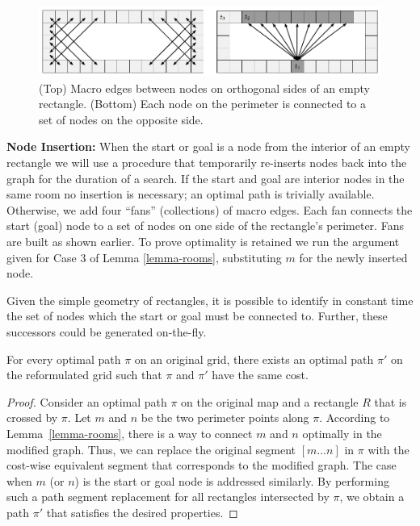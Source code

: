 \begin{figure}[tb]
       \begin{center}
		   \includegraphics[width=0.97\columnwidth, trim = 10mm 10mm 10mm 0mm]
			{diagrams/macroedges_wide.png}
       \end{center}
	\vspace{-3pt}
       \caption{(Top) Macro edges between nodes on orthogonal sides of an empty
       rectangle. (Bottom) Each node on the perimeter is connected to a set of 
		nodes on the opposite side.}
       \label{fig-macroedges}
\end{figure}

\noindent
\textbf{Node Insertion:}
When the start or goal is a node from the interior of an empty rectangle we
will use a procedure that temporarily re-inserts nodes back into the 
graph for the duration of a search.
{If the start and goal are interior nodes
in the same room no insertion is necessary; an optimal path is trivially
available. } {Otherwise, we add four ``fans'' (collections) of macro edges.  Each fan connects
the start (goal) node to a set of nodes on one side of the rectangle's
perimeter.  Fans are built as shown earlier.}
To prove optimality is retained we run the argument given
for Case 3 of Lemma \ref{lemma-rooms}, substituting $m$ for the newly inserted node.
\par
Given the simple geometry of rectangles, it is possible to identify in constant
time the set of nodes which the start or goal must be connected to.  Further,
these successors could be generated on-the-fly.

\begin{theorem}
For every optimal path $\pi$ on an original grid, there exists an optimal path
$\pi'$ on the reformulated grid such that $\pi$ and $\pi'$ have the
same cost.
\end{theorem}
\begin{proof}
Consider an optimal path $\pi$ on the original map and a rectangle $R$ that is
crossed by $\pi$.  Let $m$ and $n$ be the two perimeter points along $\pi$.
According to Lemma~\ref{lemma-rooms}, there is a way to connect $m$ and $n$
optimally in the modified graph. Thus, we can replace the original segment $[m
\dots n]$ in $\pi$ with the cost-wise equivalent segment that corresponds to the
modified graph.  The case when $m$ (or $n$) is the start or goal node is
addressed similarly.  By performing such a
path segment replacement for all rectangles intersected by $\pi$, we obtain a
path $\pi'$ that satisfies the desired properties.
\end{proof}

